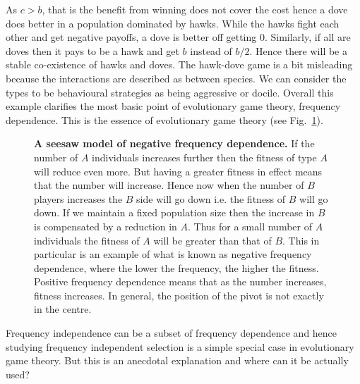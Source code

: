 \documentclass[oneside,11pt,a4paper]{book}
\begin{document}
As $c>b$, that is the benefit from winning does not cover the cost hence a dove does better in a population dominated by hawks.
While the hawks fight each other and get negative payoffs, a dove is better off getting $0$.
Similarly, if all are doves then it pays to be a hawk and get $b$ instead of $b/2$.
Hence there will be a stable co-existence of hawks and doves.
The hawk-dove game is a bit misleading because the interactions are described as between species.
We can consider the types to be behavioural strategies as being aggressive or docile.
Overall this example clarifies the most basic point of evolutionary game theory, frequency dependence.
This is the essence of evolutionary game theory (see Fig.\ \ref{fig:seesaw}).
%
\begin{figure}[!h]
  \begin{center}
    \caption{\textbf{A seesaw model of negative frequency dependence.}
    \small{If the number of $A$ individuals increases further then the fitness of type $A$ will reduce even more.
    But having a greater fitness in effect means that the number will increase.
    Hence now when the number of $B$ players increases the $B$ side will go down i.e. the fitness of $B$ will go down.
    If we maintain a fixed population size then the increase in $B$ is compensated by a reduction in $A$.
    Thus for a small number of $A$ individuals the fitness of $A$ will be greater than that of $B$.
    This in particular is an example of what is known as negative frequency dependence, where the lower the frequency, the higher the fitness.
    Positive frequency dependence means that as the number increases, fitness increases.
    In general, the position of the pivot is not exactly in the centre.}
    }
    \label{fig:seesaw}
  \end{center}
\end{figure}
%
Frequency independence can be a subset of frequency dependence and hence studying frequency independent selection is a simple special case in evolutionary game theory.
But this is an anecdotal explanation and where can it be actually used?
\end{document}
